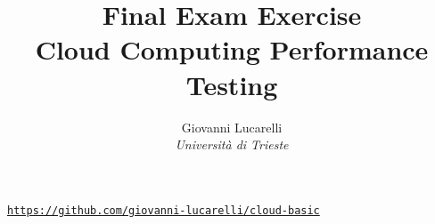 \documentclass{article}
\title{Final Exam Exercise \\Cloud Computing Performance Testing}
\author{Giovanni Lucarelli\\\textit{Università di Trieste}}
\begin{document}
\clearpage\maketitle
\begin{center}
    \vfill
    \href{https://github.com/giovanni-lucarelli/cloud-basic}{\texttt{https://github.com/giovanni-lucarelli/cloud-basic}}
\end{center}
\thispagestyle{empty}

\newpage
\tableofcontents
\newpage








\end{document}

